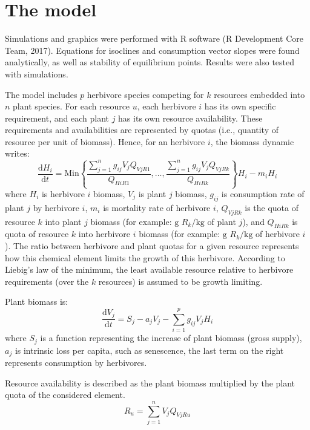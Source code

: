 \documentclass[12pt]{article}
\newcommand\equa[1]{\frac{\mathrm{d}#1}{\mathrm{d}t}}
\begin{document}

\section*{The model}
Simulations and graphics were performed with R software (R Development Core Team, 2017). Equations for isoclines and consumption vector slopes were found analytically, as well as stability of equilibrium points. Results were also tested with simulations. %

The model includes $p$ herbivore species competing for $k$ resources embedded into $n$ plant species. For each resource $u$, each herbivore $i$ has its own specific requirement, and each plant $j$ has %
its own resource availability. These requirements and availabilities are represented by quotas (i.e., quantity of resource per unit of biomass). Hence, for an herbivore $i$, the biomass dynamic writes:
\begin{equation}\label{equaherbivoregeneral}
\equa{H_i}=  \mathrm{Min} \left \lbrace \frac{\displaystyle \sum ^n _{j=1} g_{ij} V_j Q_{VjR1}}{Q_{HiR1}}, \ldots,  \frac{\displaystyle \sum ^n _{j=1} g_{ij} V_j Q_{VjRk}}{Q_{HiRk}} \right \rbrace H_i -m_i H_i
\end{equation}
where $H_i$ is herbivore $i$ biomass, $V_j$ is plant $j$ biomass, $g_{ij}$ is consumption rate of plant $j$ by herbivore $i$, $m_i$ is mortality rate of herbivore $i$, $Q_{VjRk}$ is the quota of resource $k$ into plant $j$ biomass (for example: $\text{g }R_k \text{/kg}$ of plant $j$), and $Q_{HiRk}$ is quota of resource $k$ into herbivore $i$ biomass (for example: $\text{g }R_k \text{/kg}$ of herbivore $i$). The ratio between herbivore and plant quotas for a given resource represents how this chemical element limits the growth of this herbivore. According to Liebig's law of the minimum, the least available resource relative to herbivore requirements (over the $k$ resources) is assumed to be growth limiting. \par
Plant biomass is:
\begin{equation}\label{equaplantgeneral}
\equa{V_j}=S_j-a_jV_j-\sum ^p _{i=1} g_{ij}V_jH_i
\end{equation}
where $S_j$ is a function representing the increase of plant biomass (gross supply), $a_j$ is intrinsic loss per capita, such as senescence, the last term on the right represents consumption by herbivores. 
\par
Resource availability is described as the plant biomass multiplied by the plant quota of the considered element.
\begin{equation} \label{equaresourcegeneral}
R_u=\sum ^n _{j=1} V_jQ_{VjRu}
\end{equation}
\end{document}
